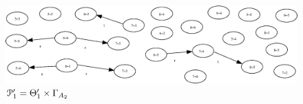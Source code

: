 \documentclass[a4paper,12pt]{article}
\newcommand{\G}{\Gamma }
\newcommand{\cP}{{\cal{P}}}
\numberwithin{equation}{section}
\numberwithin{figure}{section}
\begin{document}
\begin{figure}
\begin{center}
\includegraphics[scale=0.45, bb=0 0 400 410]{python/ex_K_i1-x-g.eps}
\caption{$\cP_1^\prime=\Theta_1^\prime\times \G_{A_2}$}
\label{fig:K_i1-x-g}
\end{center}
\end{figure}
\end{document}
